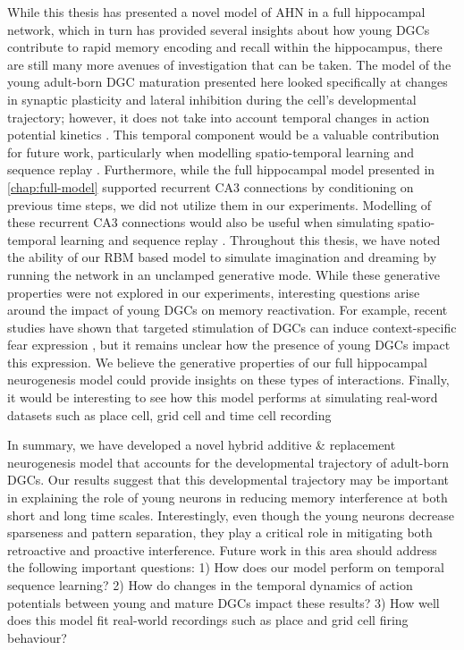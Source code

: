 While this thesis has presented a novel model of \ac{AHN} in a full hippocampal network, 
which in turn has provided several insights about how young \acp{DGC} contribute to rapid 
memory encoding and recall within the hippocampus, there are still many more avenues of 
investigation that can be taken.
The model of the young adult-born \ac{DGC} maturation presented here 
looked specifically at changes in synaptic plasticity and 
lateral inhibition during the cell's developmental trajectory; however, it does not take into account temporal 
changes in action potential kinetics \citep{enhanced_synaptic_plasticity, marin-burgin-et-al-12}. 
This temporal component would be a valuable contribution for future work, particularly when modelling 
spatio-temporal learning and sequence replay \citep{sequence_replay}.
Furthermore, while the full hippocampal model presented in \cref{chap:full-model} 
supported recurrent CA3 connections by conditioning on previous time steps, 
we did not utilize them in our experiments. 
Modelling of these recurrent CA3 connections would also be useful when simulating 
spatio-temporal learning and sequence replay \citep{sequence_replay}.
Throughout this thesis, we have noted the ability of our \ac{RBM} based model to 
simulate imagination and dreaming by running the network in an unclamped 
generative mode.
While these generative properties were not explored in our experiments, 
interesting questions arise around the impact of young \acp{DGC} on memory 
reactivation.
For example, recent studies have shown that targeted stimulation of \acp{DGC} can induce 
context-specific fear expression \citep{memory_reactivation, memory_false_activation}, but 
it remains unclear how the presence of young \acp{DGC} impact this expression.
We believe the generative properties of our full hippocampal 
neurogenesis model could provide insights on these types of interactions.
Finally, it would be interesting to see how this model performs at simulating 
real-word datasets such as place cell, grid cell and time cell recording 
\citep{place-cells, place-grid-cells, place-grid-models, time-cells}

In summary, we have developed a novel hybrid additive \& replacement 
neurogenesis model that accounts for the developmental trajectory of 
adult-born \acp{DGC}. 
Our results suggest that this developmental 
trajectory may be important in explaining the role of young neurons in 
reducing memory interference at both short and long time scales. 
Interestingly, even though the young neurons decrease sparseness and 
pattern separation, they play a critical role in mitigating both 
retroactive and proactive interference. 
Future work in this area should 
address the following important questions: 
1) How does our model perform on temporal sequence learning? 
2) How do changes in the temporal dynamics of action potentials between young and mature 
\acp{DGC} impact these results? 
3) How well does this model fit real-world recordings 
such as place and grid cell firing behaviour?
 
